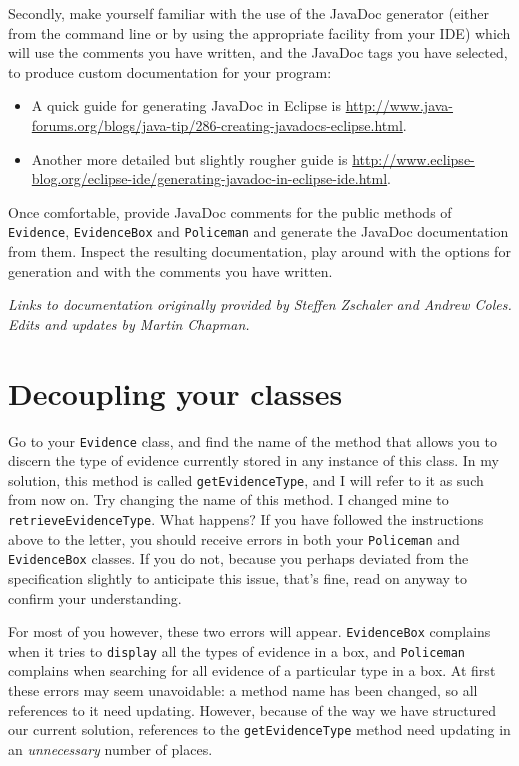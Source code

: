\documentclass[11pt]{article}
\begin{document}
Secondly, make yourself familiar with the use of the JavaDoc generator (either from the command line or by using the appropriate facility from your IDE) which will use the comments you have written, and the JavaDoc tags you have selected, to produce custom documentation for your program:

	\begin{itemize}
	
		\item A quick guide for generating JavaDoc in Eclipse is \url{http://www.java-forums.org/blogs/java-tip/286-creating-javadocs-eclipse.html}. 
		
		\item Another more detailed but slightly rougher guide is \url{http://www.eclipse-blog.org/eclipse-ide/generating-javadoc-in-eclipse-ide.html}.
		
	\end{itemize}
	
Once comfortable, provide JavaDoc comments for the public methods of \texttt{Evidence}, \texttt{EvidenceBox} and \texttt{Policeman} and generate the JavaDoc documentation from them. Inspect the resulting documentation, play around with the options for generation and with the comments you have written.

\emph{Links to documentation originally provided by Steffen Zschaler and Andrew Coles. Edits and updates by Martin Chapman.}

\section{Decoupling your classes}

Go to your \texttt{Evidence} class, and find the name of the method that allows you to discern the type of evidence currently stored in any instance of this class. In my solution, this method is called \texttt{getEvidenceType}, and I will refer to it as such from now on. Try changing the name of this method. I changed mine to \texttt{retrieveEvidenceType}. What happens? If you have followed the instructions above to the letter, you should receive errors in both your \texttt{Policeman} and \texttt{EvidenceBox} classes. If you do not, because you perhaps deviated from the specification slightly to anticipate this issue, that's fine, read on anyway to confirm your understanding.

For most of you however, these two errors will appear. \texttt{EvidenceBox} complains when it tries to \texttt{display} all the types of evidence in a box, and \texttt{Policeman} complains when searching for all evidence of a particular type in a box. At first these errors may seem unavoidable: a method name has been changed, so all references to it need updating. However, because of the way we have structured our current solution, references to the \texttt{getEvidenceType} method need updating in an \emph{unnecessary} number of places.
\end{document}
